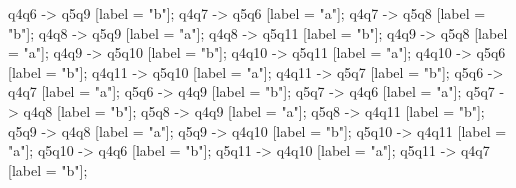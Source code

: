\documentclass[a4paper, 12pt]{article}
\begin{document}
\begin{enumerate}
{         q4q6 -> q5q9 [label = "b"];      
         q4q7 -> q5q6 [label = "a"];   
         q4q7 -> q5q8 [label = "b"];      
         q4q8 -> q5q9 [label = "a"];      
         q4q8 ->  q5q11 [label = "b"];      
         q4q9 ->  q5q8 [label = "a"];       
         q4q9 -> q5q10 [label = "b"];       
         q4q10 -> q5q11 [label = "a"];   
         q4q10 -> q5q6 [label = "b"];      
         q4q11 -> q5q10 [label = "a"];      
         q4q11 -> q5q7 [label = "b"];    
         q5q6 -> q4q7 [label = "a"];      
         q5q6 -> q4q9 [label = "b"];        
         q5q7 -> q4q6 [label = "a"];   
         q5q7 -> q4q8 [label = "b"];       
         q5q8 -> q4q9 [label = "a"];       
         q5q8 ->  q4q11 [label = "b"];      
         q5q9 ->  q4q8 [label = "a"];       
         q5q9 -> q4q10 [label = "b"];      
         q5q10 -> q4q11 [label = "a"];   
         q5q10 -> q4q6 [label = "b"];      
         q5q11 -> q4q10 [label = "a"];       
         q5q11 -> q4q7 [label = "b"];   
    }
\end{enumerate}
\end{document}
